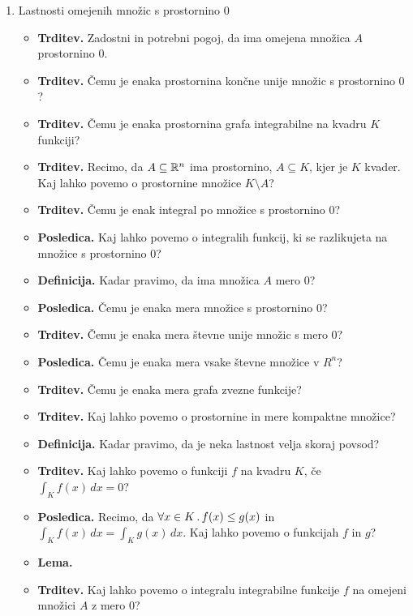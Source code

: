 \begin{enumerate}
    \item Lastnosti omejenih množic s prostornino \(0\)
    \begin{itemize}
        \item \colorbox{blue!30}{\textbf{Trditev.}} Zadostni in potrebni pogoj, da ima omejena množica \(A\) prostornino \(0\).
        \item \colorbox{blue!30}{\textbf{Trditev.}} Čemu je enaka prostornina končne unije množic s prostornino \(0\)?
        \item \colorbox{blue!30}{\textbf{Trditev.}} Čemu je enaka prostornina  grafa integrabilne na kvadru \(K\) funkciji?
        \item \colorbox{blue!30}{\textbf{Trditev.}} Recimo, da \(A \subseteq \mathbb{R}^n\) ima prostornino, \(A \subseteq K\), kjer je \(K\) kvader. Kaj lahko povemo o prostornine množice \(K \setminus A\)?
        \item \colorbox{blue!30}{\textbf{Trditev.}} Čemu je enak integral po množice s prostornino \(0\)?
        \item \colorbox{orange!30}{\textbf{Posledica.}} Kaj lahko povemo o integralih funkcij, ki se razlikujeta na množice s prostornino \(0\)?
        \item \colorbox{purple!30}{\textbf{Definicija.}} Kadar pravimo, da ima množica \(A\) mero \(0\)?
        \item \colorbox{orange!30}{\textbf{Posledica.}} Čemu je enaka mera množice s prostornino \(0\)?
        \item \colorbox{blue!30}{\textbf{Trditev.}} Čemu je enaka mera števne unije množic s mero \(0\)?
        \item \colorbox{orange!30}{\textbf{Posledica.}} Čemu je enaka mera vsake števne množice v \(R^n\)?
        \item \colorbox{blue!30}{\textbf{Trditev.}} Čemu je enaka mera grafa zvezne funkcije?
        \item \colorbox{blue!30}{\textbf{Trditev.}} Kaj lahko povemo o prostornine in mere kompaktne množice?
        \item \colorbox{purple!30}{\textbf{Definicija.}} Kadar pravimo, da je neka lastnost velja skoraj povsod?
        \item  \colorbox{blue!30}{\textbf{Trditev.}} Kaj lahko povemo o funkciji \(f\) na kvadru \(K\), če \(\int_K f(x) \, dx = 0\)?
        \item \colorbox{orange!30}{\textbf{Posledica.}} Recimo, da \(\forall x \in K \,.\, f(x) \leq g(x)\) in \(\int_K f(x) \, dx = \int_K g(x) \, dx\). Kaj lahko povemo o funkcijah \(f\) in \(g\)?
        \item \colorbox{blue!30}{\textbf{Lema.}} \todo
        \item \colorbox{blue!30}{\textbf{Trditev.}} Kaj lahko povemo o integralu integrabilne funkcije \(f\) na omejeni množici \(A\) z mero \(0\)?
    \end{itemize}


\end{enumerate}

